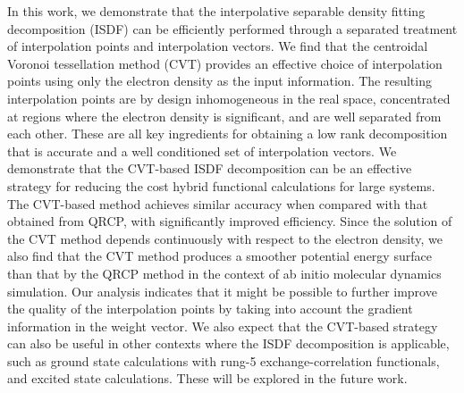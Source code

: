 In this work, we demonstrate that the interpolative separable density fitting
decomposition (ISDF) can be efficiently performed through a separated treatment
of interpolation points and interpolation vectors. We find that the centroidal
Voronoi tessellation method (CVT) provides an effective choice of interpolation
points using only the electron density as the input information. The resulting
interpolation points are by design inhomogeneous in the real space, concentrated
at regions where the electron density is significant, and are well separated
from each other. These are all key ingredients for obtaining a low rank
decomposition that is accurate and a well conditioned set of interpolation
vectors. We demonstrate that the CVT-based ISDF decomposition can be an
effective strategy for reducing the cost hybrid functional calculations for
large systems. The CVT-based method achieves similar accuracy when compared with
that obtained from QRCP, with significantly improved efficiency. Since the
solution of the CVT method depends continuously with respect to the electron
density, we also find that the CVT method produces a smoother potential energy
surface than that by the QRCP method in the context of ab initio molecular
dynamics simulation. Our analysis indicates that it might be possible to further
improve the quality of the interpolation points by taking into account the
gradient information in the weight vector. We also expect that the CVT-based
strategy can also be useful in other contexts where the ISDF decomposition is
applicable, such as ground state calculations with rung-5 exchange-correlation
functionals, and excited state calculations. These will be explored in the
future work.